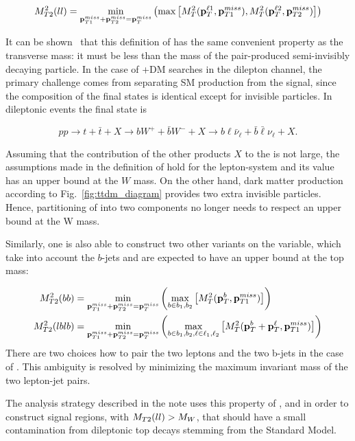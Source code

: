   \begin{equation}
    \label{eq:mt2ll}
    M_{T2}^2(ll) = \min_{\mathbf{p}_{T1}^{miss} + \mathbf{p}_{T2}^{miss} = \mathbf{p}_T^{miss}} \left( \max \left[ M_{T}^2(\mathbf{p}_T^{\ell1},\mathbf{p}_{T1}^{miss}) , M_{T}^2(\mathbf{p}_T^{\ell2},\mathbf{p}_{T2}^{miss}) \right] \right)
  \end{equation}

  It can be shown~\cite{Lester:1999tx} that this definition of \mtll has the same convenient property as the transverse mass: 
  it must be less than the mass of the pair-produced semi-invisibly decaying particle.
  In the case of \ttbar+DM searches in the dilepton channel, the primary challenge comes from separating SM \ttbar 
  production from the signal, since the composition of the final states is identical except
  for invisible particles. In dileptonic \ttbar events the final state is

  \begin{equation*}
    pp \to t + \bar{t} + X \to bW^+ + \bar{b}W^- + X \to b\ell\bar{\nu}_\ell + \bar{b}\bar{\ell}\nu_\ell + X.  
  \end{equation*}

  Assuming that the contribution of the other products $X$ to the \met is not large, the assumptions
  made in the definition of \mtll hold for the lepton-\met system and its value has an upper
  bound at the $W$ mass. On the other hand, dark matter production according to Fig.~\ref{fig:ttdm_diagram}
  provides two extra invisible particles.
  Hence, partitioning of  \met into two components no longer needs to respect an upper bound at the W mass.

  Similarly, one is also able to construct two other variants on the \mtll variable, which take into account the $b$-jets and are expected to have an upper bound at the top mass:

  \begin{align}
    \label{eq:mt2bb}
    M_{T2}^2(bb)   &= \min_{\mathbf{p}_{T1}^{miss} + \mathbf{p}_{T2}^{miss} = \mathbf{p}_T^{miss}} \left( \max_{b \in b_1,b_2} \left[ M_{T}^2(\mathbf{p}_T^{b},\mathbf{p}_{T1}^{miss}) \right] \right) \\
    M_{T2}^2(lblb) &= \min_{\mathbf{p}_{T1}^{miss} + \mathbf{p}_{T2}^{miss} = \mathbf{p}_T^{miss}} \left( \max_{b \in b_1,b_2, \ell \in \ell_1, \ell_2} \left[ M_{T}^2(\mathbf{p}_T^{b} + \mathbf{p}_T^{\ell}, \mathbf{p}_{T1}^{miss}) \right] \right)
  \end{align}
  There are two choices how to pair the two leptons  and the two b-jets in the case of \mtlblb. This ambiguity is resolved by minimizing the maximum invariant mass of the two lepton-jet pairs.

  The analysis strategy described in the note uses this property of \mtll, \mtbb and \mtlblb in order to construct
  signal regions, with $M_{T2}(ll) > M_W$, that should have a small
  contamination from dileptonic top decays stemming from the Standard Model.
